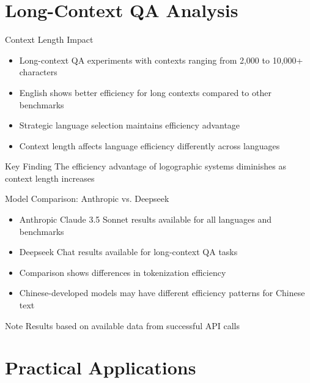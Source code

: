 \documentclass{beamer}
\begin{document}
\section{Long-Context QA Analysis}

\begin{frame}{Context Length Impact}
    \begin{itemize}
        \item Long-context QA experiments with contexts ranging from 2,000 to 10,000+ characters
        \item English shows better efficiency for long contexts compared to other benchmarks
        \item Strategic language selection maintains efficiency advantage
        \item Context length affects language efficiency differently across languages
    \end{itemize}
    
    \begin{block}{Key Finding}
        The efficiency advantage of logographic systems diminishes as context length increases
    \end{block}
\end{frame}

\begin{frame}{Model Comparison: Anthropic vs. Deepseek}
    \begin{itemize}
        \item Anthropic Claude 3.5 Sonnet results available for all languages and benchmarks
        \item Deepseek Chat results available for long-context QA tasks
        \item Comparison shows differences in tokenization efficiency
        \item Chinese-developed models may have different efficiency patterns for Chinese text
    \end{itemize}
    
    \begin{block}{Note}
        Results based on available data from successful API calls
    \end{block}
\end{frame}

\section{Practical Applications}
\end{document}

